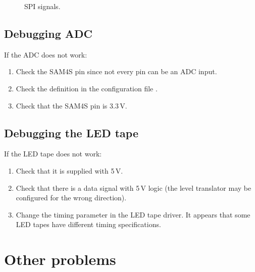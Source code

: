 \begin{figure}[!h]
  \centering
  \caption{SPI signals.}
\end{figure}


\subsection{Debugging ADC}
\label{debugging-adc}

If the ADC does not work:
%
\begin{enumerate}
\item
  Check the SAM4S pin since not every pin can be an ADC input.

\item
  Check the definition in the configuration file .

\item
  Check that the SAM4S  pin is 3.3\,V.

\end{enumerate}


\subsection{Debugging the LED tape}

If the LED tape does not work:
%
\begin{enumerate}
\item Check that it is supplied with 5\,V.

\item Check that there is a data signal with 5\,V logic (the level
  translator may be configured for the wrong direction).

\item Change the timing parameter in the LED tape driver.  It appears
  that some LED tapes have different timing specifications.
\end{enumerate}



\section{Other problems}
\label{faq}

